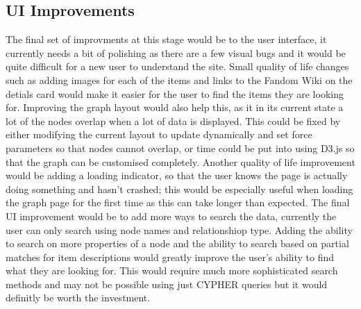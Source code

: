 \begin{description}
\subsection*{UI Improvements}
The final set of improvments at this stage would be to the user interface, it currently needs a bit of polishing as there are a few visual bugs and 
it would be quite difficult for a new user to understand the site. Small quality of life changes such as adding images for each of the items and links to 
the Fandom Wiki on the detials card would make it easier for the user to find the items they are looking for. Improving the graph layout would also help this, as 
it in its current state a lot of the nodes overlap when a lot of data is displayed. This could be fixed by either modifying the current layout to update dynamically 
and set force parameters so that nodes cannot overlap, or time could be put into using D3.js so that the graph can be customised completely. Another quality of life 
improvement would be adding a loading indicator, so that the user knows the page is actually doing something and hasn't crashed; this would be especially useful when loading 
the graph page for the first time as this can take longer than expected. The final UI improvement would be to add more ways to search the data, currently the user can 
only search using node names and relationshiop type. Adding the ability to search on more properties of a node and the ability to search based on partial matches for item descriptions would 
greatly improve the user's ability to find what they are looking for. This would require much more sophisticated search methods and may not be possible using just CYPHER queries but 
it would definitly be worth the investment.

\end{description}
